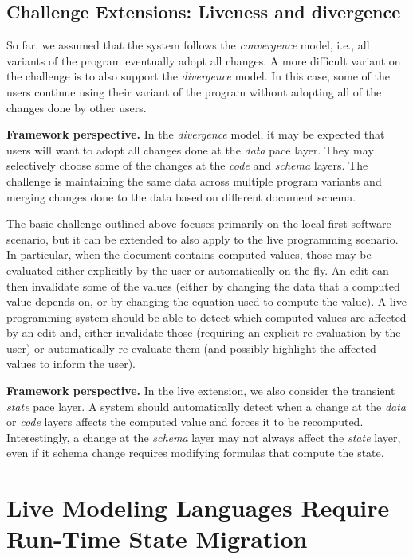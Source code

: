 \documentclass[english,submission]{programming}
\DeclareRobustCommand{\frameworkbox}[2][gray!15]{
\begin{tcolorbox}[breakable,left=3pt,right=3pt,top=3pt,bottom=3pt,colback=#1,colframe=#1,parbox=false,
  width=\dimexpr\textwidth\relax,enlarge left by=0mm,boxsep=5pt,arc=0pt,enlarge top by=0.5em,%
  outer arc=0pt]\setlength{\parskip}{0.5em}\setlength{\parindent}{0em}\textbf{\sffamily Framework perspective.}\quad #2
\end{tcolorbox}}
\begin{document}
\subsection*{Challenge Extensions: Liveness and divergence}
So far, we assumed that the system follows the \emph{convergence} model, i.e., all variants
of the program eventually adopt all changes. A more difficult variant on the challenge is to also
support the \emph{divergence} model. In this case, some of the users continue using their variant
of the program without adopting all of the changes done by other users.

\frameworkbox{
In the \emph{divergence} model, it may be expected that users will want to adopt all changes
done at the \emph{data} pace layer. They may selectively choose some of the changes at the
\emph{code} and \emph{schema} layers. The challenge is maintaining the same data across multiple
program variants and merging changes done to the data based on different document schema.
}

The basic challenge outlined above focuses primarily on the local-first software scenario, but
it can be extended to also apply to the live programming scenario. In particular, when the
document contains computed values, those may be evaluated either explicitly by the user or
automatically on-the-fly. An edit can then invalidate some of the values (either by changing
the data that a computed value depends on, or by changing the equation used to compute the value).
A live programming system should be able to detect which computed values are affected by an edit
and, either invalidate those (requiring an explicit re-evaluation by the user) or automatically
re-evaluate them (and possibly highlight the affected values to inform the user).

\frameworkbox{
In the live extension, we also consider the transient \emph{state} pace layer. A system should
automatically detect when a change at the \emph{data} or \emph{code} layers affects the computed
value and forces it to be recomputed. Interestingly, a change at the \emph{schema} layer may not
always affect the \emph{state} layer, even if it schema change requires modifying formulas that
compute the state.
}


\newpage

\section{Live Modeling Languages Require Run-Time State Migration}
\end{document}
